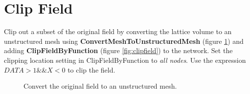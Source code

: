 \documentclass[fleqn,11pt,openany]{book}
\begin{document}
\section{Clip Field}\label{clipfieldfunc}

Clip out a subset of the original field by converting the lattice volume to an unstructured mesh using \textbf{ConvertMeshToUnstructuredMesh} (figure \ref{fig:convertmesh}) and adding \textbf{ClipFieldByFunction} (figure \ref{fig:clipfield}) to the network.
Set the clipping location setting in ClipFieldByFunction to \emph{all nodes}.
Use the expression $DATA > 1 \&\& X < 0$ to clip the field.

\begin{figure}[H]
\caption{Convert the original field to an unstructured mesh.}
\label{fig:convertmesh}
\end{figure}
\end{document}
